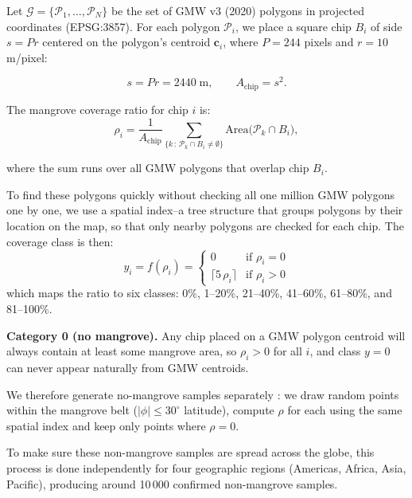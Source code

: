 \documentclass[conference,a4paper]{IEEEtran}
\begin{document}
Let $\mathcal{G} = \{\mathcal{P}_1, \ldots, \mathcal{P}_N\}$ be the set of GMW v3 (2020) polygons in projected coordinates (EPSG:3857). 
For each polygon $\mathcal{P}_i$, we place a square chip $B_i$ of side $s = Pr$ centered on the polygon's centroid $\mathbf{c}_i$, 
where $P = 244$ pixels and $r = 10$\,m/pixel:

\begin{equation}
s = Pr = 2440\;\text{m}, \qquad A_{\text{chip}} = s^2.
\end{equation}

The mangrove coverage ratio for chip $i$ is:
\begin{equation}
\rho_i = \frac{1}{A_{\text{chip}}} \sum_{\{k\,:\,\mathcal{P}_k \cap B_i \neq \emptyset\}}\!\mathrm{Area}\bigl(\mathcal{P}_k \cap B_i\bigr),
\label{eq:coverage}
\end{equation}

where the sum runs over all GMW polygons that overlap chip $B_i$. 

To find these polygons quickly without checking all one million GMW polygons one by one, 
we use a spatial index--a tree structure that groups polygons by their location on the map, so that only nearby polygons are checked for each chip. 
The coverage class is then:
\begin{equation}
y_i = f(\rho_i) = \begin{cases} 0 & \text{if } \rho_i = 0 \\ \lceil 5\,\rho_i \rceil & \text{if } \rho_i > 0 \end{cases}
\label{eq:label}
\end{equation}
which maps the ratio to six classes: 0\%, 1--20\%, 21--40\%, 41--60\%, 61--80\%, and 81--100\%.

\textbf{Category 0 (no mangrove).} Any chip placed on a GMW polygon centroid will always contain at least some mangrove area, 
so $\rho_i > 0$ for all $i$, and class $y=0$ can never appear naturally from GMW centroids. 

We therefore generate no-mangrove samples separately : we draw random points within the mangrove belt ($|\phi| \leq 30^\circ$ latitude), 
compute $\rho$ for each using the same spatial index 
and keep only points where $\rho = 0$. 

To make sure these non-mangrove samples are spread across the globe, 
this process is done independently for four geographic regions (Americas, Africa, Asia, Pacific), 
producing around 10\,000 confirmed non-mangrove samples.
\end{document}
